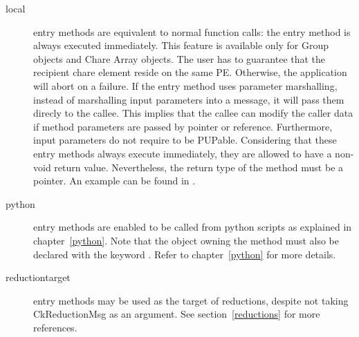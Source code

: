 \begin{description}
\item[local] entry methods are equivalent to normal function
calls: the entry method is always executed immediately. This feature is
available only for Group objects and Chare Array objects. The user has to
guarantee that the recipient chare element reside on the same PE. Otherwise,
the application will abort on a failure. If the  entry method uses
parameter marshalling, instead of marshalling input parameters into a message,
it will pass them direcly to the callee. This implies that the callee can
modify the caller data if method parameters are passed by pointer or reference.
Furthermore, input parameters do not require to be PUPable. Considering that
these entry methods always execute immediately, they are allowed to have a
non-void return value. Nevertheless, the return type of the method must be a
pointer. An example can be found in .

\item[python] entry methods are enabled to be
called from python scripts as explained in chapter~\ref{python}. Note that the object owning the method must also be declared with the
keyword . Refer to chapter~\ref{python} for more details.

\item[reductiontarget] entry methods may be used as the
target of reductions, despite not taking CkReductionMsg as an argument.
See section~\ref{reductions} for more references.

\end{description}
